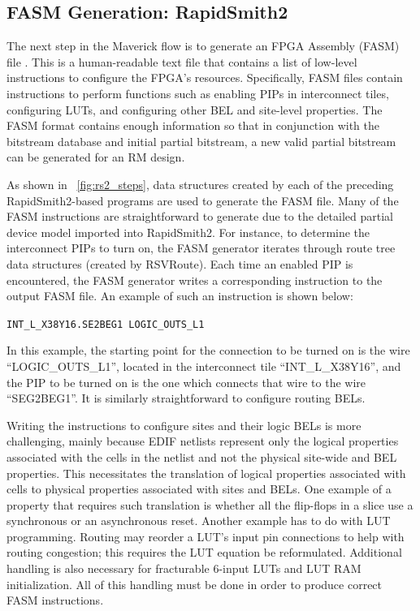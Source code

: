 \subsection{FASM Generation: RapidSmith2}
\label{sec:fasm}

The next step in the Maverick flow is to generate an FPGA Assembly (FASM) file \cite{PrjXray}.
This is a human-readable text file that contains a list of low-level instructions to configure the FPGA's resources.
Specifically, FASM files contain instructions to perform functions such as enabling PIPs in interconnect tiles, configuring LUTs, and configuring other BEL and site-level properties.
The FASM format contains enough information so that in conjunction with the bitstream database and initial partial bitstream, a new valid partial bitstream can be generated for an RM design.

As shown in \figurename~\ref{fig:rs2_steps}, data structures created by each of the preceding RapidSmith2-based programs are used to generate the FASM file.
Many of the FASM instructions are straightforward to generate due to the detailed partial device model imported into RapidSmith2.
For instance, to determine the interconnect PIPs to turn on, the FASM generator iterates through route tree data structures (created by RSVRoute).
Each time an enabled PIP is encountered, the FASM generator writes a corresponding instruction to the output FASM file.
An example of such an instruction is shown below: 
\begin{center}
	\texttt{INT\_L\_X38Y16.SE2BEG1 LOGIC\_OUTS\_L1}
\end{center}
\noindent In this example, the starting point for the connection to be turned on is the wire ``LOGIC\_OUTS\_L1'', located in the interconnect tile ``INT\_L\_X38Y16'', and the PIP to be turned on is the one which connects that wire to the wire ``SEG2BEG1''. 
It is similarly straightforward to configure routing BELs.

Writing the instructions to configure sites and their logic BELs is more challenging, mainly because EDIF netlists represent only the logical properties associated with the cells in the netlist and not the physical site-wide and BEL properties.
This necessitates the translation of logical properties associated with cells to physical properties associated with sites and BELs.
One example of a property that requires such translation is whether all the flip-flops in a slice use a synchronous or an asynchronous reset.
Another example has to do with LUT programming. 
Routing may reorder a LUT's input pin connections to help with routing congestion; this requires the LUT equation be reformulated.
Additional handling is also necessary for fracturable 6-input LUTs and LUT RAM initialization.
All of this handling must be done in order to produce correct FASM instructions.

